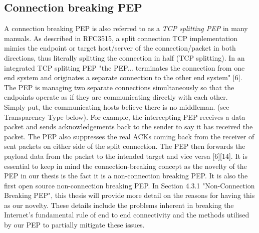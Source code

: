 \documentclass{uathesis}
\begin{document}
\subsection{Connection breaking PEP}
A connection breaking PEP is also referred to as a \emph{TCP splitting PEP} in many manuals. As described in RFC3515, a split connection TCP implementation mimics the endpoint or target host/server of the connection/packet in both directions, thus literally splitting the connection in half (TCP splitting). In an integrated TCP splitting PEP "the PEP... terminates the connection from one end system and originates a separate connection to the other end system" [6]. The PEP is managing two separate connections simultaneously so that the endpoints operate as if they are communicating directly with each other. \\

Simply put, the communicating hosts believe there is no middleman. (see Transparency Type below). For example, the intercepting PEP receives a data packet and sends acknowledgements back to the sender to say it has received the packet. The PEP also suppresses the real ACKs coming back from the receiver of sent packets on either side of the split connection. The PEP then forwards the payload data from the packet to the intended target and vice versa [6][14]. It is essential to keep in mind the connection-breaking concept as the novelty of the PEP in our thesis is the fact it is a non-connection breaking PEP. It is also the first open source non-connection breaking PEP. In Section 4.3.1 "Non-Connection Breaking PEP", this thesis will provide more detail on the reasons for having this as our novelty. These details include the problems inherent in breaking the Internet's fundamental rule of end to end connectivity and the methods utilised by our PEP to partially mitigate these issues. \\
\end{document}
